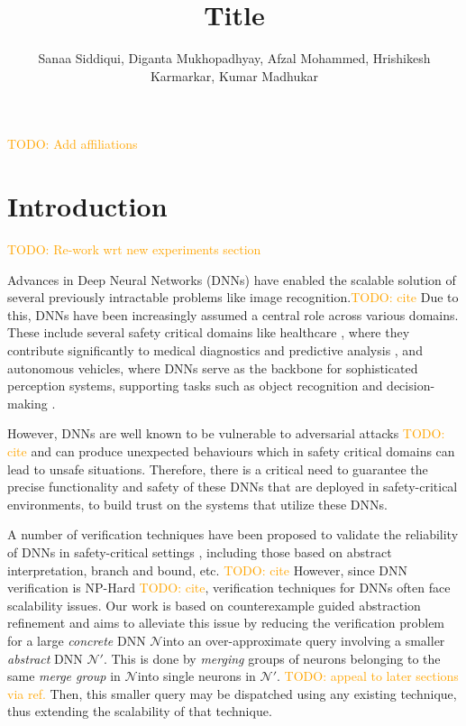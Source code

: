 \documentclass[sigplan,screen,natbib=false]{acmart}
\title{Title}
\author{Sanaa Siddiqui, Diganta Mukhopadhyay, Afzal Mohammed, Hrishikesh
Karmarkar, Kumar Madhukar }
\newcommand{\todo}[1]{\textcolor{orange}{TODO: #1}}
\newcommand{\cnc}{$\mathcal{N}$}
\newcommand{\abs}{$\mathcal{N'}$}
\begin{document}
\maketitle
\todo{ Add affiliations}
    
\section{Introduction}

\todo{ Re-work wrt new experiments section }

Advances in Deep Neural Networks (DNNs) have enabled the scalable solution
of several previously intractable problems like image recognition.\todo{
cite} Due to this, DNNs have been increasingly assumed a central role across
various domains. These include several safety critical domains like healthcare
\cite{b1},
where they contribute significantly to medical diagnostics and predictive
analysis \cite{b2}, and autonomous vehicles, where DNNs serve as the
backbone for sophisticated perception systems, supporting tasks such as object
recognition and decision-making \cite{b3}. 


However, DNNs are well known to be vulnerable to adversarial attacks \todo{
cite} and can produce unexpected behaviours which in safety critical domains can
lead to unsafe situations. Therefore, there is a critical need to guarantee the
precise functionality and safety of these DNNs that are deployed in
safety-critical environments, to build trust on the systems that utilize these
DNNs.

A number of verification techniques have been proposed to validate
the reliability of DNNs in safety-critical settings \cite{b4, b5}, including
those based on abstract interpretation, branch and bound, etc. \todo{ cite
} However, since DNN verification is NP-Hard \todo{ cite}, verification
techniques for DNNs often face scalability issues. Our work is based on
counterexample guided abstraction refinement \cite{cegar-nn} and aims to
alleviate this issue by reducing the verification problem for a large
\textit{concrete} DNN \cnc into an over-approximate query involving a smaller
\textit{abstract} DNN \abs. This is done by \textit{merging} groups of neurons
belonging to the same \textit{merge group} in \cnc into single neurons in \abs.
\todo{ appeal to later sections via ref.}
Then, this smaller query may be dispatched using any existing technique, thus
extending the scalability of that technique. 
\end{document}
